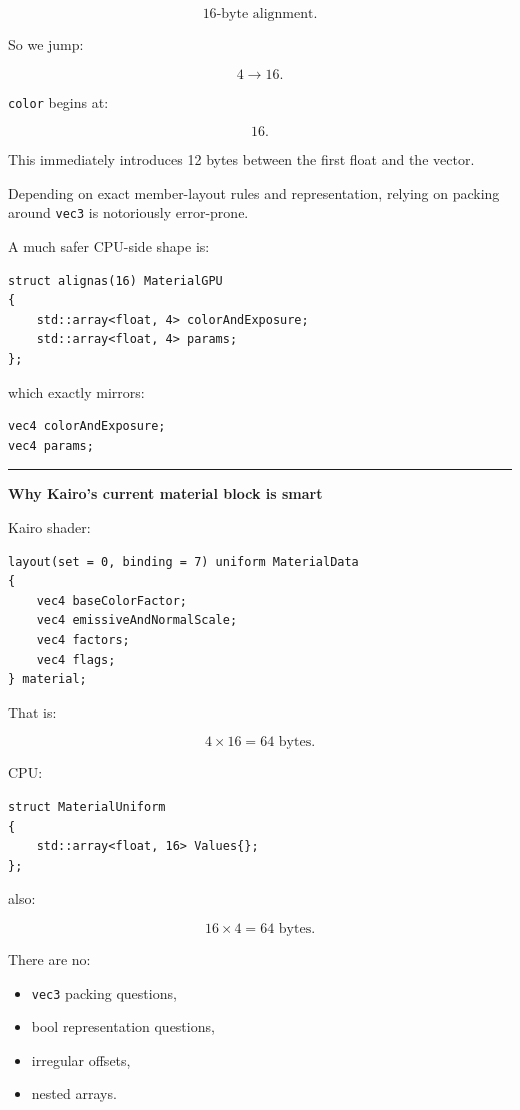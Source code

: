\[
16\text{-byte alignment}.
\]

So we jump:

\[
4\rightarrow16.
\]

\texttt{color} begins at:

\[
16.
\]

This immediately introduces 12 bytes between the first float and the vector.

Depending on exact member-layout rules and representation, relying on packing around \texttt{vec3} is notoriously error-prone.

A much safer CPU-side shape is:

\begin{verbatim}
struct alignas(16) MaterialGPU
{
    std::array<float, 4> colorAndExposure;
    std::array<float, 4> params;
};
\end{verbatim}

which exactly mirrors:

\begin{verbatim}
vec4 colorAndExposure;
vec4 params;
\end{verbatim}

\begin{center}\rule{0.5\linewidth}{0.5pt}\end{center}

\textbf{Why Kairo's current material block is smart}

Kairo shader:

\begin{verbatim}
layout(set = 0, binding = 7) uniform MaterialData
{
    vec4 baseColorFactor;
    vec4 emissiveAndNormalScale;
    vec4 factors;
    vec4 flags;
} material;
\end{verbatim}

That is:

\[
4\times16=64\text{ bytes}.
\]

CPU:

\begin{verbatim}
struct MaterialUniform
{
    std::array<float, 16> Values{};
};
\end{verbatim}

also:

\[
16\times4=64\text{ bytes}.
\]

There are no:

\begin{itemize}
\tightlist
\item
  \texttt{vec3} packing questions,
\item
  bool representation questions,
\item
  irregular offsets,
\item
  nested arrays.
\end{itemize}

